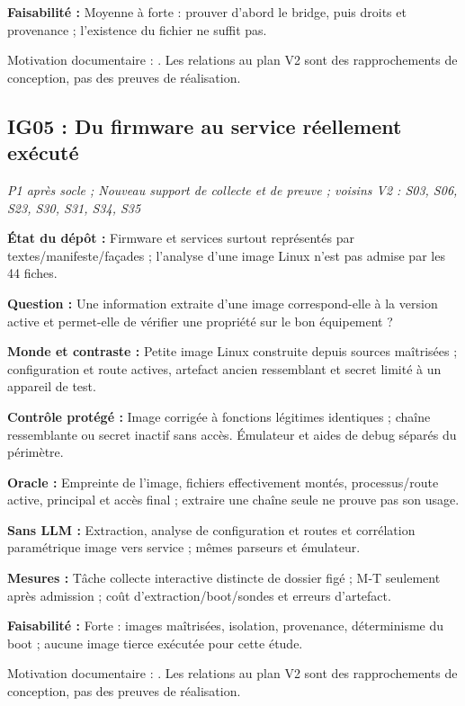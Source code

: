 \documentclass[11pt,a4paper]{article}
\begin{document}
\textbf{Faisabilité :} Moyenne à forte : prouver d'abord le bridge, puis droits et provenance ; l'existence du fichier ne suffit pas.

Motivation documentaire : \cite{mqtt,mosquitto}. Les relations au plan V2 sont des rapprochements de conception, pas des preuves de réalisation.

\begin{samepage}\subsection{IG05 : Du firmware au service réellement exécuté}
\textit{P1 après socle ; Nouveau support de collecte et de preuve ; voisins V2 : S03, S06, S23, S30, S31, S34, S35}

\textbf{État du dépôt :} Firmware et services surtout représentés par textes/manifeste/façades ; l'analyse d'une image Linux n'est pas admise par les 44 fiches.
\par\end{samepage}
\textbf{Question :} Une information extraite d'une image correspond-elle à la version active et permet-elle de vérifier une propriété sur le bon équipement ?

\textbf{Monde et contraste :} Petite image Linux construite depuis sources maîtrisées ; configuration et route actives, artefact ancien ressemblant et secret limité à un appareil de test.

\textbf{Contrôle protégé :} Image corrigée à fonctions légitimes identiques ; chaîne ressemblante ou secret inactif sans accès. Émulateur et aides de debug séparés du périmètre.

\textbf{Oracle :} Empreinte de l'image, fichiers effectivement montés, processus/route active, principal et accès final ; extraire une chaîne seule ne prouve pas son usage.

\textbf{Sans LLM :} Extraction, analyse de configuration et routes et corrélation paramétrique image vers service ; mêmes parseurs et émulateur.

\textbf{Mesures :} Tâche collecte interactive distincte de dossier figé ; M-T seulement après admission ; coût d'extraction/boot/sondes et erreurs d'artefact.

\textbf{Faisabilité :} Forte : images maîtrisées, isolation, provenance, déterminisme du boot ; aucune image tierce exécutée pour cette étude.

Motivation documentaire : \cite{goat,goat-sol,firmae,firmadyne}. Les relations au plan V2 sont des rapprochements de conception, pas des preuves de réalisation.
\end{document}
